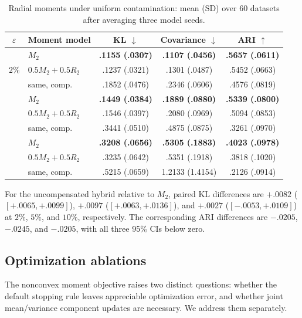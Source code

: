 \documentclass[11pt,a4paper]{article}
\newcommand{\best}[1]{\textbf{#1}}
\newcommand{\Mtwo}{M_2}
\newcommand{\Rtwo}{R_2}
\begin{document}
\begin{table}[ht]
\centering
\scriptsize
\caption{Radial moments under uniform contamination: mean (SD) over 60
datasets after averaging three model seeds.}
\label{tab:radial_contamination}
\begin{tabular}{@{}c l c c c@{}}
\toprule
$\varepsilon$ & Moment model & KL $\downarrow$ & Covariance $\downarrow$ & ARI $\uparrow$ \\
\midrule
\multirow{3}{*}{$2\%$}
 & $\Mtwo$ & \best{.1155 (.0307)} & \best{.1107 (.0456)} & \best{.5657 (.0611)} \\
 & $0.5\Mtwo+0.5\Rtwo$ & .1237 (.0321) & .1301 (.0487) & .5452 (.0663) \\
 & same, comp. & .1852 (.0476) & .2346 (.0606) & .4576 (.0819) \\
\addlinespace
\multirow{3}{*}{$5\%$}
 & $\Mtwo$ & \best{.1449 (.0384)} & \best{.1889 (.0880)} & \best{.5339 (.0800)} \\
 & $0.5\Mtwo+0.5\Rtwo$ & .1546 (.0397) & .2080 (.0969) & .5094 (.0853) \\
 & same, comp. & .3441 (.0510) & .4875 (.0875) & .3261 (.0970) \\
\addlinespace
\multirow{3}{*}{$10\%$}
 & $\Mtwo$ & \best{.3208 (.0656)} & \best{.5305 (.1883)} & \best{.4023 (.0978)} \\
 & $0.5\Mtwo+0.5\Rtwo$ & .3235 (.0642) & .5351 (.1918) & .3818 (.1020) \\
 & same, comp. & .5215 (.0659) & 1.2133 (1.4154) & .2126 (.0914) \\
\bottomrule
\end{tabular}
\end{table}

For the uncompensated hybrid relative to $\Mtwo$, paired KL differences are
$+.0082$ ($[+.0065,+.0099]$), $+.0097$ ($[+.0063,+.0136]$), and $+.0027$
($[-.0053,+.0109]$) at $2\%$, $5\%$, and $10\%$, respectively.  The
corresponding ARI differences are $-.0205$, $-.0245$, and $-.0205$, with all
three 95\% CIs below zero.

\subsection{Optimization ablations}
\label{sec:optimizer_ablation}

The nonconvex moment objective raises two distinct questions: whether the
default stopping rule leaves appreciable optimization error, and whether
joint mean/variance component updates are necessary.  We address them
separately.
\end{document}
